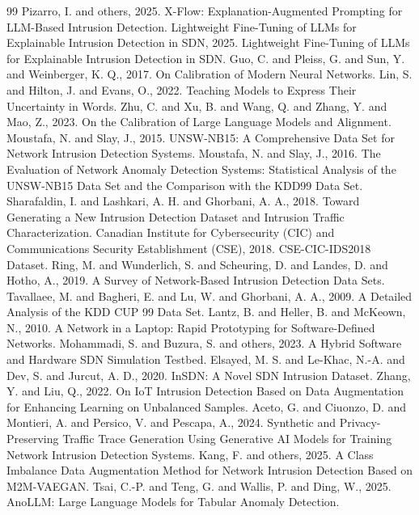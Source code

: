 \documentclass[12pt,a4paper]{article}
\begin{document}
\begin{thebibliography}{99}
 Pizarro, I. and others, 2025. X-Flow: Explanation-Augmented Prompting for LLM-Based Intrusion Detection.
 Lightweight Fine-Tuning of LLMs for Explainable Intrusion Detection in SDN, 2025. Lightweight Fine-Tuning of LLMs for Explainable Intrusion Detection in SDN.
 Guo, C. and Pleiss, G. and Sun, Y. and Weinberger, K. Q., 2017. On Calibration of Modern Neural Networks.
 Lin, S. and Hilton, J. and Evans, O., 2022. Teaching Models to Express Their Uncertainty in Words.
 Zhu, C. and Xu, B. and Wang, Q. and Zhang, Y. and Mao, Z., 2023. On the Calibration of Large Language Models and Alignment.
 Moustafa, N. and Slay, J., 2015. UNSW-NB15: A Comprehensive Data Set for Network Intrusion Detection Systems.
 Moustafa, N. and Slay, J., 2016. The Evaluation of Network Anomaly Detection Systems: Statistical Analysis of the UNSW-NB15 Data Set and the Comparison with the KDD99 Data Set.
 Sharafaldin, I. and Lashkari, A. H. and Ghorbani, A. A., 2018. Toward Generating a New Intrusion Detection Dataset and Intrusion Traffic Characterization.
 Canadian Institute for Cybersecurity (CIC) and Communications Security Establishment (CSE), 2018. CSE-CIC-IDS2018 Dataset.
 Ring, M. and Wunderlich, S. and Scheuring, D. and Landes, D. and Hotho, A., 2019. A Survey of Network-Based Intrusion Detection Data Sets.
 Tavallaee, M. and Bagheri, E. and Lu, W. and Ghorbani, A. A., 2009. A Detailed Analysis of the KDD CUP 99 Data Set.
 Lantz, B. and Heller, B. and McKeown, N., 2010. A Network in a Laptop: Rapid Prototyping for Software-Defined Networks.
 Mohammadi, S. and Buzura, S. and others, 2023. A Hybrid Software and Hardware SDN Simulation Testbed.
 Elsayed, M. S. and Le-Khac, N.-A. and Dev, S. and Jurcut, A. D., 2020. InSDN: A Novel SDN Intrusion Dataset.
 Zhang, Y. and Liu, Q., 2022. On IoT Intrusion Detection Based on Data Augmentation for Enhancing Learning on Unbalanced Samples.
 Aceto, G. and Ciuonzo, D. and Montieri, A. and Persico, V. and Pescapa, A., 2024. Synthetic and Privacy-Preserving Traffic Trace Generation Using Generative AI Models for Training Network Intrusion Detection Systems.
 Kang, F. and others, 2025. A Class Imbalance Data Augmentation Method for Network Intrusion Detection Based on M2M-VAEGAN.
 Tsai, C.-P. and Teng, G. and Wallis, P. and Ding, W., 2025. AnoLLM: Large Language Models for Tabular Anomaly Detection.

\end{thebibliography}
\end{document}
